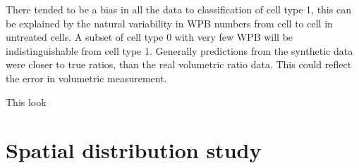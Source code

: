 There tended to be a bias in all the data to classification of cell type 1, this can be explained by the natural variability in WPB numbers from cell to cell in untreated cells. A subset of cell type 0 with very few WPB will be indistinguishable from cell type 1. Generally predictions from the synthetic data were closer to true ratios, than the real volumetric ratio data. This could reflect the error in volumetric measurement.

This look 


\section{Spatial distribution study}
\label{endothelial_morphometry:spatial_distribution}
